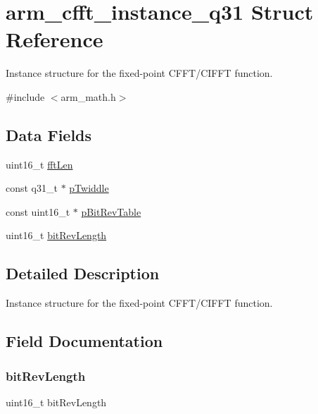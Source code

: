 \hypertarget{structarm__cfft__instance__q31}{}\section{arm\+\_\+cfft\+\_\+instance\+\_\+q31 Struct Reference}
\label{structarm__cfft__instance__q31}


Instance structure for the fixed-\/point C\+F\+F\+T/\+C\+I\+F\+FT function.  




{\ttfamily \#include $<$arm\+\_\+math.\+h$>$}

\subsection*{Data Fields}
\begin{DoxyCompactItemize}
\item 
uint16\+\_\+t \mbox{\hyperlink{structarm__cfft__instance__q31_ab8db3bbe7c61e6bb8ca2a55e3446e11a}{fft\+Len}}
\item 
const q31\+\_\+t $\ast$ \mbox{\hyperlink{structarm__cfft__instance__q31_a9760c603af5d85652496dbffd63a8a2e}{p\+Twiddle}}
\item 
const uint16\+\_\+t $\ast$ \mbox{\hyperlink{structarm__cfft__instance__q31_a3b229432d381b0a511a9cdbe3aa74e78}{p\+Bit\+Rev\+Table}}
\item 
uint16\+\_\+t \mbox{\hyperlink{structarm__cfft__instance__q31_a65e1b3e327b8fab9404287ed8f347cc8}{bit\+Rev\+Length}}
\end{DoxyCompactItemize}


\subsection{Detailed Description}
Instance structure for the fixed-\/point C\+F\+F\+T/\+C\+I\+F\+FT function. 

\subsection{Field Documentation}
\mbox{\label{structarm__cfft__instance__q31_a65e1b3e327b8fab9404287ed8f347cc8}} 
\subsubsection{\texorpdfstring{bitRevLength}{bitRevLength}}
{\footnotesize\ttfamily uint16\+\_\+t bit\+Rev\+Length}

